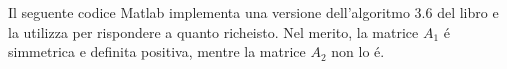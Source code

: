 \begin{center}
\footnotesize\noindent{}\end{center}

\noindent Il seguente codice Matlab implementa una versione dell'algoritmo 3.6 del libro e la utilizza per rispondere a quanto richeisto. Nel merito, la matrice \(A_1\) \'e simmetrica e definita positiva, mentre la matrice \(A_2\) non lo \'e.
\\


